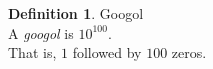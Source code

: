 \documentclass[10pt]{article}
\theoremstyle{definition}
\newtheorem*{defn}{Definition}
\begin{document}
\begin{defn}{Googol \\}
A \textit{googol} is $10^{100}$. \\
That is, $1$ followed by $100$ zeros.
\end{defn}
\end{document}
